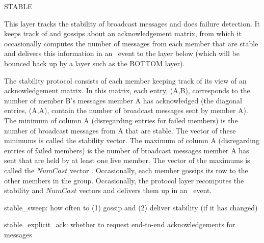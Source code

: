 \begin{Layer}{STABLE}

This layer tracks the stability of broadcast messages and does
failure detection.  It keeps track of and gossips about an
acknowledgement matrix, from which it occasionally computes the
number of messages from each member that are stable and delivers this
information in an \DnStable\ event to the layer below (which will be
bounced back up by a layer such as the BOTTOM layer).

\begin{Protocol}
The stability protocol consists of each member keeping track of its
view of an acknowledgement matrix.  In this matrix, each entry,
(A,B), corresponds to the number of member B's messages member A has
acknowledged (the diagonal entries, (A,A), contain the number of
broadcast messages sent by member A).  The minimum of column A
(disregarding entries for failed members) is the number of broadcast
messages from A that are stable.  The vector of these minimums is
called the stability vector.  The maximum of column A (disregarding
entries of failed members) is the number of broadcast messages member
A has sent that are held by at least one live member.  The vector of
the maximums is called the $NumCast$ vector .  Occasionally, each member gossips its row to the
other members in the group.  Occasionally, the protocol layer
recomputes the stability and $NumCast$ vectors and delivers them up
in an \DnStable\ event.
\end{Protocol}

\begin{Parameters}
\item 
stable\_sweep: how often to (1) gossip and (2) deliver stability (if
it has changed)
\item 
stable\_explicit\_ack: whether to request end-to-end acknowledgements
for messages
\end{Parameters}


\end{Layer}
